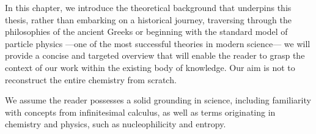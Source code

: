 
In this chapter, we introduce the theoretical background that underpins this
thesis, rather than embarking on a historical journey, traversing through the
philosophies of the ancient Greeks or beginning with the standard model of
particle physics ---one of the most successful theories in modern science---
we will provide a concise and targeted overview that will enable the reader to
grasp the context of our work within the existing body of knowledge. Our aim
is not to reconstruct the entire chemistry from scratch.

We assume the reader possesses a solid grounding in science, including
familiarity with concepts from infinitesimal calculus, as well as terms
originating in chemistry and physics, such as nucleophilicity and entropy.

